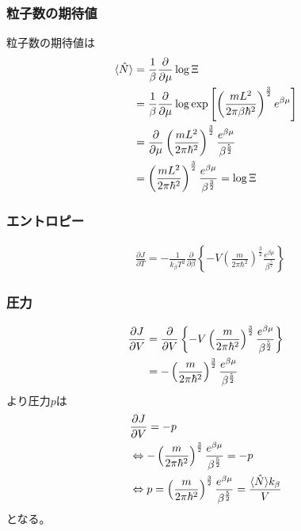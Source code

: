 \documentclass{jsarticle}  %
\numberwithin{equation}{section} %
\numberwithin{figure}{section}
\begin{document}
\subsubsection{粒子数の期待値}
    粒子数の期待値は
    \begin{align}
        \langle \hat{N} \rangle &= \frac{1}{\beta} \frac{\partial }{\partial \mu} \log \Xi \notag \\
        &= \frac{1}{\beta} \frac{\partial }{\partial \mu} \log \exp \left[ \left( \frac{mL^2}{2\pi \beta \hbar^2 } \right)^{\frac{3}{2}} e^{\beta \mu} \right] \notag \\
        &= \frac{\partial }{\partial \mu} \left( \frac{mL^2}{2\pi \hbar^2 } \right)^{\frac{3}{2}} \frac{e^{\beta \mu}}{\beta^{\frac{5}{2}}} \notag \\
        &= \left( \frac{mL^2}{2\pi \hbar^2 } \right)^{\frac{3}{2}} \frac{e^{\beta \mu}}{\beta^{\frac{3}{2}}} = \log \Xi
    \end{align}
\subsubsection{エントロピー}
    \begin{align}
        &\frac{\partial J}{\partial T} = -\frac{1}{k_\beta T^2} \frac{\partial }{\partial \beta} \left\{ -V \left( \frac{m}{2\pi \hbar^2 } \right)^{\frac{3}{2}} \frac{e^{\beta \mu}}{\beta^{\frac{5}{2}}} \right\}
    \end{align}
\subsubsection{圧力}
    \begin{align}
        \frac{\partial J}{\partial V} &= \frac{\partial }{\partial V} \left\{ -V \left( \frac{m}{2\pi \hbar^2 } \right)^{\frac{3}{2}} \frac{e^{\beta \mu}}{\beta^{\frac{5}{2}}} \right\} \notag \\
        &= - \left( \frac{m}{2\pi \hbar^2 } \right)^{\frac{3}{2}} \frac{e^{\beta \mu}}{\beta^{\frac{5}{2}}} \notag \\
    \end{align}
    より圧力$p$は
    \begin{align}
        &\frac{\partial J}{\partial V} = -p \notag \\
        &\Leftrightarrow  - \left( \frac{m}{2\pi \hbar^2 } \right)^{\frac{3}{2}} \frac{e^{\beta \mu}}{\beta^{\frac{5}{2}}}  = -p \notag \\
        &\Leftrightarrow p = \left( \frac{m}{2\pi \hbar^2 } \right)^{\frac{3}{2}} \frac{e^{\beta \mu}}{\beta^{\frac{5}{2}}} = \frac{\langle \hat{N} \rangle k_\beta}{V} 
    \end{align}
    となる。
\end{document}
